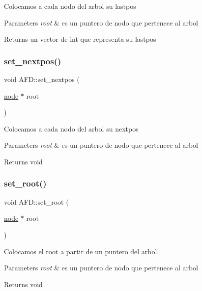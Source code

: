 Colocamos a cada nodo del arbol su lastpos 
\begin{DoxyParams}{Parameters}
{\em root} & es un puntero de nodo que pertenece al arbol \\
\hline
\end{DoxyParams}
\begin{DoxyReturn}{Returns}
un vector de int que representa su lastpos 
\end{DoxyReturn}
\hypertarget{class_a_f_d_a2d612d265dfc6864e7563d4e242ef100}{}\label{class_a_f_d_a2d612d265dfc6864e7563d4e242ef100} 
\subsubsection{\texorpdfstring{set\+\_\+nextpos()}{set\_nextpos()}}
{\footnotesize\ttfamily void A\+F\+D\+::set\+\_\+nextpos (\begin{DoxyParamCaption}\item[{\hyperlink{structnode}{node} $\ast$}]{root }\end{DoxyParamCaption})}

Colocamos a cada nodo del arbol su nextpos 
\begin{DoxyParams}{Parameters}
{\em root} & es un puntero de nodo que pertenece al arbol \\
\hline
\end{DoxyParams}
\begin{DoxyReturn}{Returns}
void 
\end{DoxyReturn}
\hypertarget{class_a_f_d_ac2df8498d53da64cef08893ab213db12}{}\label{class_a_f_d_ac2df8498d53da64cef08893ab213db12} 
\subsubsection{\texorpdfstring{set\+\_\+root()}{set\_root()}}
{\footnotesize\ttfamily void A\+F\+D\+::set\+\_\+root (\begin{DoxyParamCaption}\item[{\hyperlink{structnode}{node} $\ast$}]{root }\end{DoxyParamCaption})}

Colocamos el root a partir de un puntero del arbol. 
\begin{DoxyParams}{Parameters}
{\em root} & es un puntero de nodo que pertenece al arbol \\
\hline
\end{DoxyParams}
\begin{DoxyReturn}{Returns}
void 
\end{DoxyReturn}
\hypertarget{class_a_f_d_ab5db119b186c71e653e54d4abc82c068}{}\label{class_a_f_d_ab5db119b186c71e653e54d4abc82c068} 
